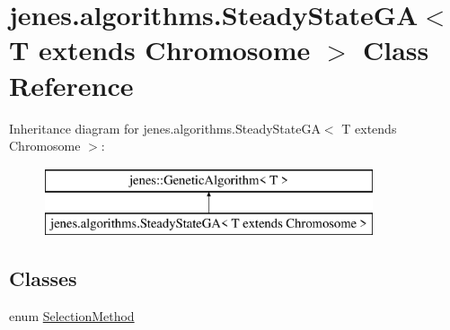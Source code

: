 \hypertarget{classjenes_1_1algorithms_1_1_steady_state_g_a_3_01_t_01extends_01_chromosome_01_4}{\section{jenes.\-algorithms.\-Steady\-State\-G\-A$<$ T extends Chromosome $>$ Class Reference}
\label{classjenes_1_1algorithms_1_1_steady_state_g_a_3_01_t_01extends_01_chromosome_01_4}
}
Inheritance diagram for jenes.\-algorithms.\-Steady\-State\-G\-A$<$ T extends Chromosome $>$\-:\begin{figure}[H]
\begin{center}
\leavevmode
\includegraphics[height=2.000000cm]{classjenes_1_1algorithms_1_1_steady_state_g_a_3_01_t_01extends_01_chromosome_01_4}
\end{center}
\end{figure}
\subsection*{Classes}
\begin{DoxyCompactItemize}
\item 
enum \hyperlink{enumjenes_1_1algorithms_1_1_steady_state_g_a_3_01_t_01extends_01_chromosome_01_4_1_1_selection_method}{Selection\-Method}
\end{DoxyCompactItemize}

